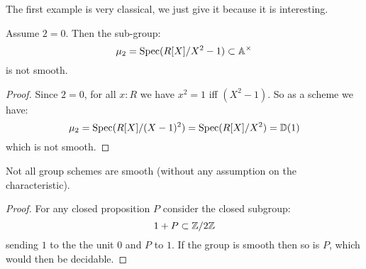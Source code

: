 The first example is very classical, we just give it because it is interesting.

\begin{lemma}
Assume $2=0$. Then the sub-group:
\[\mu_2 = \operatorname{Spec}(R[X]/X^2-1) \subset \mathbb{A}^\times\]
is not smooth.
\end{lemma}

\begin{proof}
Since $2=0$, for all $x:R$ we have $x^2=1$ iff $(X^2-1)$. So as a scheme we have:
\[\mu_2 = \operatorname{Spec}(R[X]/(X-1)^2) = \operatorname{Spec}(R[X]/X^2) = \mathbb{D}(1)\]
which is not smooth.
\end{proof}

\begin{proposition}
Not all group schemes are smooth (without any assumption on the characteristic).
\end{proposition}

\begin{proof}
For any closed proposition $P$ consider the closed subgroup:
\[1+P \subset \mathbb{Z}/2\mathbb{Z}\]
sending $1$ to the the unit $0$ and $P$ to $1$. If the group is smooth then so is $P$, which would then be decidable.
\end{proof}
